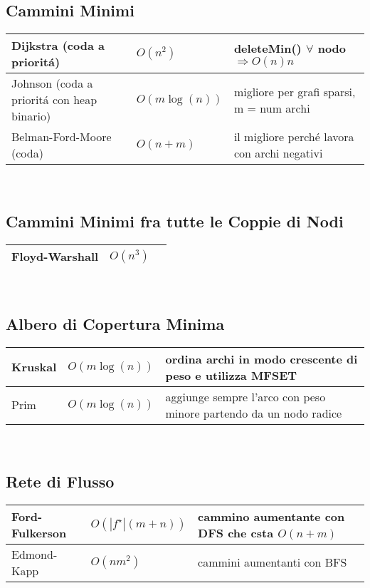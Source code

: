 \documentclass[12pt]{article}
\newcommand\abs[1]{\left|#1\right|}
\begin{document}
\subsection*{Cammini Minimi}
\begin{tabularx}{\textwidth}{ p{6cm} p{2.7cm} | X }
    \hline
    	Dijkstra {\scriptsize (coda a priorit\'a)}  & 
    	$O(n^2)$ & 
    	{\footnotesize deleteMin() $\forall$ nodo $\Rightarrow O(n)n $} \\ 
    \hline
		Johnson  {\scriptsize (coda a priorit\'a con heap binario)}  & 
		$O(m\log(n))$ & 
		{\footnotesize migliore per grafi sparsi, m = num archi} \\ 
	\hline
		Belman-Ford-Moore {\scriptsize (coda)} & 
		$O(n+m)$ &
		{\footnotesize il migliore perch\'e lavora con archi negativi} \\ 
	\hline
\end{tabularx}
\\
\subsection*{Cammini Minimi fra tutte le Coppie di Nodi}
\begin{tabularx}{\textwidth}{ p{6cm} p{2.7cm} | X }
    \hline
    	Floyd-Warshall & 
    	$O(n^3)$ & 
    	\\ 
    \hline
\end{tabularx}
\\
\subsection*{Albero di Copertura Minima}
\begin{tabularx}{\textwidth}{ p{6cm} p{2.7cm} | X }
    \hline
    	Kruskal & 
    	$O(m\log(n))$ & 
    	{\footnotesize ordina archi in modo crescente di peso e utilizza MFSET} \\ 
    \hline
   		Prim & 
    	$O(m\log(n))$ & 
    	{\footnotesize aggiunge sempre l'arco con peso minore partendo da un nodo radice} \\ 
    \hline
\end{tabularx}
\\
\subsection*{Rete di Flusso}
\begin{tabularx}{\textwidth}{ p{6cm} p{2.7cm} | X }
    \hline
    	Ford-Fulkerson & 
    	$O( \abs{f^{\star}}(m+n) )$ & 
    	{\footnotesize cammino aumentante con DFS che csta $O(n+m)$} \\ 
    \hline
   		Edmond-Kapp & 
    	$O(nm^2)$ & 
    	{\footnotesize cammini aumentanti con BFS} \\ 
    \hline
\end{tabularx}
\end{document}
